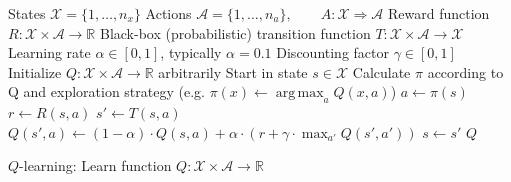 \documentclass{article}
\DeclareMathOperator*{\argmax}{arg\,max}
\begin{document}
\begin{preview}
    \begin{algorithm}[H]
        \begin{algorithmic}
        \Require
        \Statex States $\mathcal{X} = \{1, \dots, n_x\}$
        \Statex Actions $\mathcal{A} = \{1, \dots, n_a\},\qquad A: \mathcal{X} \Rightarrow \mathcal{A}$
        \Statex Reward function $R: \mathcal{X} \times \mathcal{A} \rightarrow \mathbb{R}$
        \Statex Black-box (probabilistic) transition function $T: \mathcal{X} \times \mathcal{A} \rightarrow \mathcal{X}$
        \Statex Learning rate $\alpha \in [0, 1]$, typically $\alpha = 0.1$
        \Statex Discounting factor $\gamma \in [0, 1]$
            \State Initialize $Q: \mathcal{X} \times \mathcal{A} \rightarrow \mathbb{R}$ arbitrarily
                \State Start in state $s \in \mathcal{X}$
                    \State Calculate $\pi$ according to Q and exploration strategy (e.g. $\pi(x) \gets \argmax_{a} Q(x, a)$)
                    \State $a \gets \pi(s)$
                    \State $r \gets R(s, a)$ 
                    \State $s' \gets T(s, a)$ 
                    \State $Q(s', a) \gets (1 - \alpha) \cdot Q(s, a) + \alpha \cdot (r + \gamma \cdot \max_{a'} Q(s', a'))$
                    \State $s \gets s'$
                \EndWhile
            \EndWhile
            \Return $Q$
        \EndProcedure
        \end{algorithmic}
    \caption{$Q$-learning: Learn function $Q: \mathcal{X} \times \mathcal{A} \rightarrow \mathbb{R}$}
    \label{alg:q-learning}
    \end{algorithm}
\end{preview}
\end{document}
